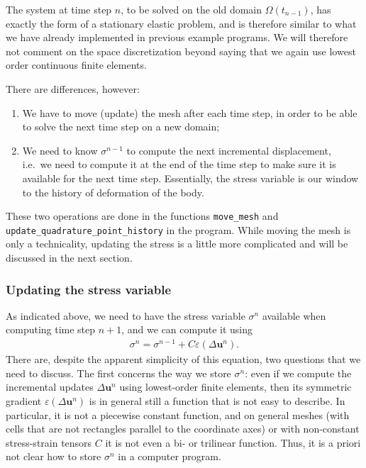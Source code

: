\documentclass{article}
\renewcommand{\vec}[1]{\mathbf{#1}}
\begin{document}
The system at time step $n$, to be solved on the old domain
$\Omega(t_{n-1})$, has exactly the form of a stationary elastic
problem, and is therefore similar to what we have already implemented
in previous example programs. We will therefore not comment on the
space discretization beyond saying that we again use lowest order
continuous finite elements.

There are differences, however:
\begin{enumerate}
  \item We have to move (update) the mesh after each time step, in order to be 
  able to solve the next time step on a new domain;

  \item We need to know $\sigma^{n-1}$ to compute the next incremental
  displacement, i.e.~we need to compute it at the end of the time step
  to make sure it is available for the next time step. Essentially,
  the stress variable is our window to the history of deformation of
  the body.
\end{enumerate}
These two operations are done in the functions \texttt{move\_mesh} and
\texttt{update\_\-quadrature\_\-point\_history} in the program. While moving
the mesh is only a technicality, updating the stress is a little more
complicated and will be discussed in the next section.


\subsubsection*{Updating the stress variable}

As indicated above, we need to have the stress variable $\sigma^n$ available
when computing time step $n+1$, and we can compute it using
\begin{gather}
  \label{eq:stress-update}
  \sigma^n = \sigma^{n-1} + C \varepsilon (\Delta \vec u^n).  
\end{gather}
There are, despite the apparent simplicity of this equation, two questions
that we need to discuss. The first concerns the way we store $\sigma^n$: even
if we compute the incremental updates $\Delta\vec u^n$ using lowest-order
finite elements, then its symmetric gradient $\varepsilon(\Delta\vec u^n)$ is
in general still a function that is not easy to describe. In particular, it is
not a piecewise constant function, and on general meshes (with cells that are
not rectangles parallel to the coordinate axes) or with non-constant
stress-strain tensors $C$ it is not even a bi- or trilinear function. Thus, it
is a priori not clear how to store $\sigma^n$ in a computer program.
\end{document}
